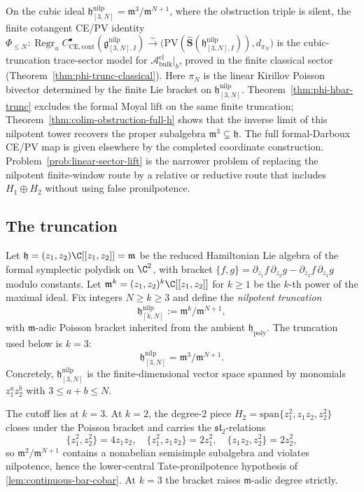 On the cubic ideal
$\mathfrak h^{\mathrm{nilp}}_{[3,N]}=\mathfrak m^3/\mathfrak m^{N+1}$, where the
obstruction triple is silent, the finite cotangent CE/PV identity
$\Phi_{\leq N}\colon
\operatorname{Regr}_u
C^\bullet_{\mathrm{CE},\mathrm{cont}}(\mathfrak g^{\mathrm{nilp}}_{[3,N],I})
\xrightarrow{\sim}
\bigl(\mathrm{PV}(\widehat{\mathbf S}(\mathfrak h^{\mathrm{nilp}}_{[3,N],I})),
d_{\pi_N}\bigr)$ is the
cubic-truncation trace-sector model for
\(\mathcal A^{\mathrm{cl}}_{\mathrm{bulk}}|_b\), proved in the finite
classical sector
(Theorem~\ref{thm:phi-trunc-classical}).
Here \(\pi_N\) is the linear Kirillov Poisson bivector determined by
the finite Lie bracket on \(\mathfrak h^{\mathrm{nilp}}_{[3,N]}\).
Theorem~\ref{thm:phi-hbar-trunc} excludes the formal Moyal lift on
the same finite truncation;
Theorem~\ref{thm:colim-obstruction-full-h} shows that the inverse limit
of this nilpotent tower recovers the proper subalgebra
\(\mathfrak m^3\subsetneq\mathfrak h\).  The full formal-Darboux CE/PV
map is given elsewhere by the completed coordinate construction.
Problem~\ref{prob:linear-sector-lift} is the narrower problem of
replacing the nilpotent finite-window route by a relative or reductive
route that includes \(H_1\oplus H_2\) without using false
pronilpotence.

\subsection*{The truncation}

Let $\mathfrak h=(z_1,z_2)\C[[z_1,z_2]]=\mathfrak m$ be the reduced
Hamiltonian Lie algebra of the formal symplectic polydisk on $\C^2$, with
bracket $\{f,g\}=\partial_{z_1}f\,\partial_{z_2}g-
\partial_{z_2}f\,\partial_{z_1}g$ modulo constants. Let
$\mathfrak m^k=(z_1,z_2)^k\C[[z_1,z_2]]$ for $k\geq 1$ be the
$k$-th power of the maximal ideal. Fix integers $N\geq k\geq 3$ and
define the \emph{nilpotent truncation}
$$\mathfrak h^{\mathrm{nilp}}_{[k,N]}:=\mathfrak m^k/\mathfrak m^{N+1},$$
with $\mathfrak m$-adic Poisson bracket inherited from the
ambient $\mathfrak h_{\mathrm{poly}}$. The truncation used below is
$k=3$:
$$\mathfrak h^{\mathrm{nilp}}_{[3,N]}=
  \mathfrak m^3/\mathfrak m^{N+1}.$$
Concretely, $\mathfrak h^{\mathrm{nilp}}_{[3,N]}$ is the finite-dimensional vector
space spanned by monomials $z_1^az_2^b$ with $3\leq a+b\leq N$.

The cutoff lies at $k=3$.  At $k=2$, the degree-$2$ piece
$H_2=\mathrm{span}\{z_1^2,z_1z_2,z_2^2\}$ closes under the Poisson
bracket and carries the $\mathfrak{sl}_2$-relations
$$\{z_1^2,z_2^2\}=4z_1z_2,\quad
  \{z_1^2,z_1z_2\}=2z_1^2,\quad
  \{z_1z_2,z_2^2\}=2z_2^2,$$
so $\mathfrak m^2/\mathfrak m^{N+1}$ contains a nonabelian semisimple
subalgebra and violates nilpotence, hence the lower-central
Tate-pronilpotence hypothesis of \ref{lem:continuous-bar-cobar}.  At
$k=3$ the bracket raises $\mathfrak m$-adic degree strictly.


